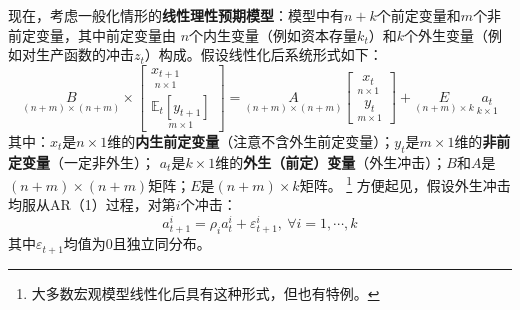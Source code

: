 现在，考虑一般化情形的\textbf{线性理性预期模型}：模型中有$n+k$个前定变量和$m$个非前定变量，其中前定变量由
$n$个内生变量（例如资本存量$k_t$）和$k$个外生变量（例如对生产函数的冲击$z_t$）构成。假设线性化后系统形式如下：
\begin{equation}    \label{eq-linear-ration-expectation}
    \underset{(n+m) \times(n+m)}{B} \times 
        \begin{bmatrix}
            \underset{n\times 1}{x_{t+1}} \\
            \underset{m\times 1}{\mathbb{E}_t\left[y_{t+1}\right]}
        \end{bmatrix}
     = \underset{(n+m) \times(n+m)}{A}
        \begin{bmatrix}
            \underset{n\times 1}{x_{t}} \\
            \underset{m\times 1}{y_{t}}
        \end{bmatrix}
        +
        \underset{(n+m) \times k}{E} ~ \underset{k \times 1}{a_t}
\end{equation}
其中：$x_t$是$n\times 1$维的\textbf{内生前定变量}（注意不含外生前定变量）；$y_t$是$m\times 1$维的\textbf{非前定变量}（一定非外生）；
$a_t$是$k\times 1$维的\textbf{外生（前定）变量}（外生冲击）；$B$和$A$是$(n+m)\times(n+m)$矩阵；$E$是$(n+m)\times k$矩阵。
\footnote{大多数宏观模型线性化后具有这种形式，但也有特例。}
方便起见，假设外生冲击均服从AR（1）过程，对第$i$个冲击：
\begin{equation*}
    a_{t+1}^i = \rho_i a_t^i + \varepsilon_{t+1}^i,~ \forall i=1,\cdots,k
\end{equation*}
其中$\varepsilon_{t+1}$均值为0且独立同分布。

